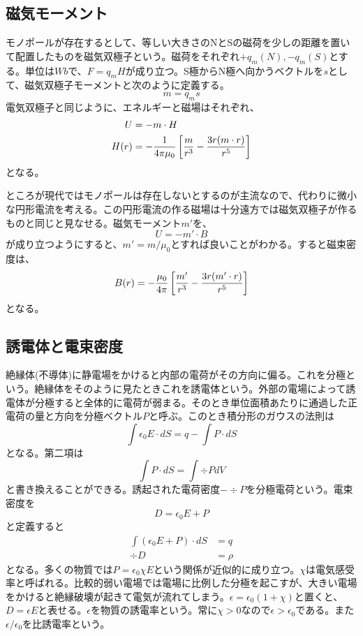 \subsection{磁気モーメント}
    モノポールが存在するとして、等しい大きさのNとSの磁荷を少しの距離を置いて配置したものを磁気双極子という。磁荷をそれぞれ$+q_m(N), -q_m(S)$とする。単位は$Wb$で、$F = q_m H$が成り立つ。S極からN極へ向かうベクトルを$s$として、磁気双極子モーメントと次のように定義する。
        \[m = q_m s\]
    電気双極子と同じように、エネルギーと磁場はそれぞれ、
    \begin{align*}
        U &= -m \cdot H\\
        H(r) &= -\frac{1}{4\pi\mu_0}\left[\frac{m}{r^3} - \frac{3r(m\cdot r)}{r^5} \right]
    \end{align*}
    となる。

    ところが現代ではモノポールは存在しないとするのが主流なので、代わりに微小な円形電流を考える。この円形電流の作る磁場は十分遠方では磁気双極子が作るものと同じと見なせる。磁気モーメント$m'$を、
        \[U = -m' \cdot B\]
    が成り立つようにすると、$m' = m / \mu_0$とすれば良いことがわかる。すると磁束密度は、
        \[B(r) = -\frac{\mu_0}{4\pi}\left[\frac{m'}{r^3} - \frac{3r(m'\cdot r)}{r^5} \right]\]
    となる。

\subsection{誘電体と電束密度}
    絶縁体(不導体)に静電場をかけると内部の電荷がその方向に偏る。これを分極という。絶縁体をそのように見たときこれを誘電体という。外部の電場によって誘電体が分極すると全体的に電荷が弱まる。そのとき単位面積あたりに通過した正電荷の量と方向を分極ベクトル$P$と呼ぶ。このとき積分形のガウスの法則は
        \[\int \epsilon_0 E \cdot dS = q - \int P \cdot dS\]
    となる。第二項は
        \[\int P \cdot dS = \int \div P dV\]
    と書き換えることができる。誘起された電荷密度$-\div P$を分極電荷という。電束密度を
        \[D = \epsilon_0 E + P\]
    と定義すると
    \begin{align*}
        \int (\epsilon_0 E + P) \cdot dS &= q\\
        \div D &= \rho
    \end{align*}
    となる。多くの物質では$P = \epsilon_0\chi E$という関係が近似的に成り立つ。$\chi$は電気感受率と呼ばれる。比較的弱い電場では電場に比例した分極を起こすが、大きい電場をかけると絶縁破壊が起きて電気が流れてしまう。$\epsilon = \epsilon_0(1 + \chi)$と置くと、$D = \epsilon E$と表せる。$\epsilon$を物質の誘電率という。常に$\chi > 0$なので$\epsilon > \epsilon_0$である。また$\epsilon / \epsilon_0$を比誘電率という。

